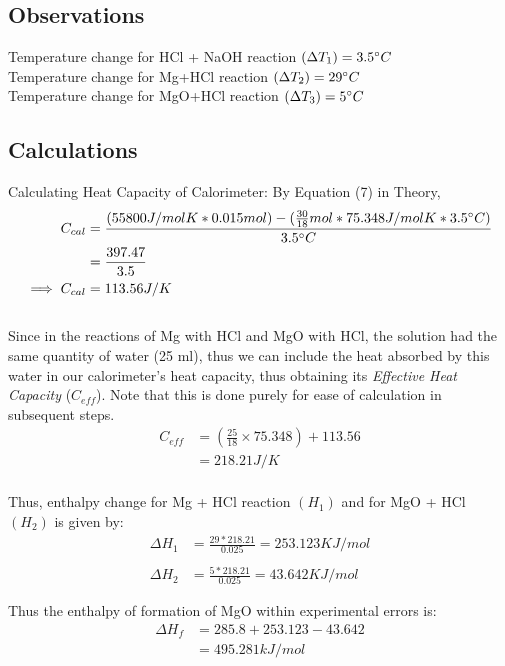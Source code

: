 \cleardoublepage
\subsection{Observations}
Temperature change for HCl + NaOH reaction $(\Delta T_1) = 3.5\degree C$ \\
Temperature change for Mg+HCl reaction $(\Delta T_2) = 29\degree C$ \\
Temperature change for MgO+HCl reaction $(\Delta T_3) = 5\degree C$ \\

\subsection{Calculations}
Calculating Heat Capacity of Calorimeter:
By Equation (7) in Theory,
\begin{align*}
  C_{cal}&=\frac{(55800J/molK * 0.015 mol) - (\frac{30}{18} mol * 75.348J/mol K * 3.5\degree C)}{3.5\degree C} \\
  &= \frac{397.47}{3.5} \\
    \implies C_{cal}&=113.56 J/K
\end{align*}
\\
Since in the reactions of Mg with HCl and MgO with HCl, the solution had the same quantity of water (25 ml), thus we can include the heat absorbed by this water in our calorimeter's heat capacity, thus obtaining its \emph{Effective Heat Capacity} ($C_{eff}$). Note that this is done purely for ease of calculation in subsequent steps.
\begin{align*}
  C_{eff} &= (\frac{25}{18} \times 75.348) + 113.56 \\
  &=218.21 J/K \\
\end{align*}

Thus, enthalpy change for Mg + HCl reaction $(H_1)$ and for MgO + HCl $(H_2)$ is given by:
\begin{align*}
  \Delta H_1 &= \frac{29*218.21}{0.025} = 253.123 KJ/mol \\ \\
  \Delta H_2 &= \frac{5*218.21}{0.025} = 43.642 KJ/mol
\end{align*}

Thus the enthalpy of formation of MgO within experimental errors is:
\begin{align*}
  \Delta H_f &= 285.8 + 253.123 - 43.642 \\
&= 495.281 kJ/mol
\end{align*}

